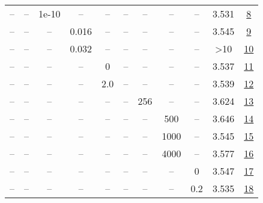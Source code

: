 \begin{table}[H]
\begin{tabular}{ccccccccccc}
-- & -- & 1e-10 & -- & -- & -- & -- & -- & -- & 3.531 & \href{https://wandb.ai/stanford-mercury/optimizer-scaling/runs/sweep-130m-2B-nadamw96aba0lr0.008-wd0.1-minlr0-warmup2000-b10.95-2ac247}{8} \\
-- & -- & -- & 0.016 & -- & -- & -- & -- & -- & 3.545 & \href{https://wandb.ai/stanford-mercury/optimizer-scaling/runs/sweep-130m-2B-nadamw159eedlr0.016-wd0.1-minlr0-warmup2000-b10.95-28f35b}{9} \\
-- & -- & -- & 0.032 & -- & -- & -- & -- & -- & >10 & \href{https://wandb.ai/stanford-mercury/optimizer-scaling/runs/sweep-130m-2B-nadamw174bdclr0.032-wd0.1-minlr0-warmup2000-b10.95-fff99c}{10} \\
-- & -- & -- & -- & 0 & -- & -- & -- & -- & 3.537 & \href{https://wandb.ai/stanford-mercury/optimizer-scaling/runs/sweep-130m-2B-nadamwe3eb70lr0.008-wd0.1-minlr0-warmup2000-b10.95-60184b}{11} \\
-- & -- & -- & -- & 2.0 & -- & -- & -- & -- & 3.539 & \href{https://wandb.ai/stanford-mercury/optimizer-scaling/runs/sweep-130m-2B-nadamw7da7d1lr0.008-wd0.1-minlr0-warmup2000-b10.95-11c74a}{12} \\
-- & -- & -- & -- & -- & -- & 256 & -- & -- & 3.624 & \href{https://wandb.ai/stanford-mercury/optimizer-scaling/runs/sweep-130m-2B-nadamw702024lr0.008-wd0.1-minlr0-warmup2000-b10.95-a5ebd4}{13} \\
-- & -- & -- & -- & -- & -- & -- & 500 & -- & 3.646 & \href{https://wandb.ai/stanford-mercury/optimizer-scaling/runs/sweep-130m-2B-nadamw25143blr0.008-wd0.1-minlr0-warmup500-b10.95--79c4c9}{14} \\
-- & -- & -- & -- & -- & -- & -- & 1000 & -- & 3.545 & \href{https://wandb.ai/stanford-mercury/optimizer-scaling/runs/sweep-130m-2B-nadamw973c1flr0.008-wd0.1-minlr0-warmup1000-b10.95-1c7190}{15} \\
-- & -- & -- & -- & -- & -- & -- & 4000 & -- & 3.577 & \href{https://wandb.ai/stanford-mercury/optimizer-scaling/runs/sweep-130m-2B-nadamw4becd7lr0.008-wd0.1-minlr0-warmup4000-b10.95-d4ab10}{16} \\
-- & -- & -- & -- & -- & -- & -- & -- & 0 & 3.547 & \href{https://wandb.ai/stanford-mercury/optimizer-scaling/runs/sweep-130m-2B-nadamwab5756lr0.008-wd0-minlr0-warmup2000-b10.95-b-6e00e5}{17} \\
-- & -- & -- & -- & -- & -- & -- & -- & 0.2 & 3.535 & \href{https://wandb.ai/stanford-mercury/optimizer-scaling/runs/sweep-130m-2B-nadamw2ed6cdlr0.008-wd0.2-minlr0-warmup2000-b10.95-1ea7c2}{18} \\
\bottomrule
\end{tabular}
\end{table}

